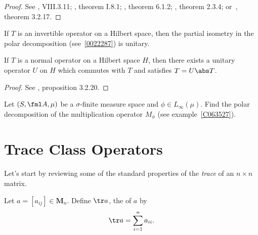 \begin{proof} See \cite{Conway:1990}, VIII.3.11; \cite{Davidson:1996}, theorem I.8.1;
\cite{KadisonR:1983}, theorem 6.1.2; \cite{Murphy:1990}, theorem 2.3.4;
or~\cite{Pedersen:1995}, theorem 3.2.17. \ns
\end{proof}

\begin{cor} If $T$ is an
invertible operator on a Hilbert space, then the partial isometry in the polar
decomposition (see~\ref{0022287}) is unitary.
\end{cor}

\begin{prop} If $T$ is a
normal operator on a Hilbert space $H$, then there exists a unitary operator $U$ on $H$
which commutes with $T$ and satisfies $T = U\abs T$.
\end{prop}

\begin{proof} See \cite{Pedersen:1995}, proposition 3.2.20.\ns \end{proof}

\begin{exer} Let $(S, \fml A,\mu)$ be a $\sigma$-finite measure space and $\phi \in
L_\infty(\mu)$. Find the polar decomposition of the
multiplication operator $M_\phi$ (see example~\ref{C063527}).
\end{exer}









\section{Trace Class Operators}

Let's start by reviewing some of the standard properties of the \emph{trace} of an $n \times n$ matrix.

\begin{defn}\label{tr0113} Let $a = [a_{ij}] \in \mathbf M_n$. Define $\tr a$, the
 of $a$ by
  \[ \tr a = \sum_{i = 1}^n a_{ii}. \]
\end{defn}

